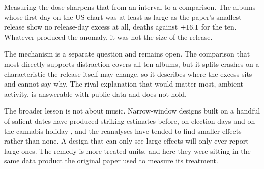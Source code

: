 \documentclass[11pt]{article}
\begin{document}
Measuring the dose sharpens that from an interval to a comparison. The
\numNDoseMatched{} albums whose first day on the US chart was at least as large as the paper's
smallest release show no release-day excess at all, \numEffectDoseMatched{} deaths against
$+16.1$ for the ten. Whatever produced the anomaly, it was not the size of the
release.

The mechanism is a separate question and remains open. The comparison that most directly supports
distraction covers all ten albums, but it splits crashes on a characteristic
the release itself may change, so it describes where the excess sits and cannot say why. The rival
explanation that would matter most, ambient activity, is answerable with public data and does not
hold.

The broader lesson is not about music. Narrow-window designs built on a handful of salient dates
have produced striking estimates before, on election days \citep{zhang2016election} and on the
cannabis holiday \citep{palayew2019cannabis, brown2018reexamining}, and the reanalyses have tended
to find smaller effects rather than none. A design that can only see large effects will only ever
report large ones. The remedy is more treated units, and here they were sitting in the same data
product the original paper used to measure its treatment.



\end{document}

